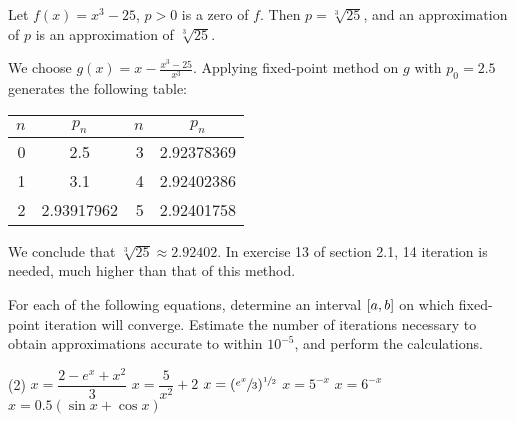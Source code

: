 \documentclass[../../../../Assignments]{subfiles}
\begin{document}
\begin{solution}
    Let \(f(x) = x^3 - 25\), \(p > 0\) is a zero of \(f\). Then \(p =
    \sqrt[3]{25}\), and an approximation of \(p\) is an approximation of
    \(\sqrt[3]{25}\).

    We choose \(g(x) = x - \frac{x^3 - 25}{x^3}\). Applying fixed-point method
    on \(g\) with \(p_0 = \num{2.5}\) generates the following table:

    \begin{table}[H]
        \centering
        \begin{tabular}{r S[table-format=1.8] r S[table-format=1.8]}
            \toprule
            \(n\)  &   {\(p_n\)}   &  \(n\)  &   {\(p_n\)}   \\
              &  2.5          &      3  &  2.92378369   \\
                1  &  3.1          &      4  &  2.92402386   \\
                2  &  2.93917962   &      5  &  2.92401758   \\
            \bottomrule
        \end{tabular}
    \end{table}

    We conclude that \(\sqrt[3]{25} \approx \num{2.92402}\). In exercise 13 of
    section 2.1, 14 iteration is needed, much higher than that of this method.
\end{solution}

\begin{exercise}
    For each of the following equations, determine an interval
    \(\interval{a}{b}\) on which fixed-point iteration will converge. Estimate
    the number of iterations necessary to obtain approximations accurate to
    within \(10^{-5}\), and perform the calculations.

    \begin{tasks}(2)
        \task \(x = \dfrac{2 - e^x + x^2}{3}\)
        \task \(x = \dfrac{5}{x^2} + 2\)
        \task \(x = (\sfrac{e^x}{3})^{\sfrac{1}{2}}\)
        \task \(x = 5^{-x}\)
        \task \(x = 6^{-x}\)
        \task \(x = \num{0.5}(\sin{x} + \cos{x})\)
    \end{tasks}
\end{exercise}
\end{document}
